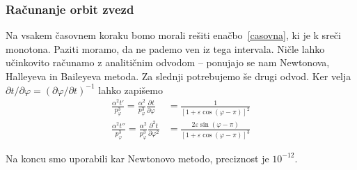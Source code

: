 \documentclass[12pt, a4paper]{article}
\newcommand{\der}[3][]{
    \ensuremath{ \frac{\partial^{#1} #2}{\partial #3^{#1}} }
}
\begin{document}
\subsubsection{Ra\v cunanje orbit zvezd}
Na vsakem \v casovnem koraku bomo morali re\v siti ena\v cbo~\eqref{casovna}, ki je k sre\v ci monotona. Paziti moramo,
da ne pademo ven iz tega intervala. Ni\v cle lahko u\v cinkovito ra\v cunamo z analiti\v cnim odvodom -- ponujajo se
nam Newtonova, Halleyeva in Baileyeva metoda. Za slednji potrebujemo \v se drugi odvod. Ker velja $\partial t/\partial
\varphi = (\partial \varphi/\partial t)^{-1}$ lahko zapi\v semo
\begin{align}
    \frac{\alpha^2 t'}{p_\varphi^3} = \frac{\alpha^2}{p_\varphi^3} \der{t}{\varphi} &= \frac{1}{[1 +
        \varepsilon\cos(\varphi - \pi)]^2}
	\label{odvodcasa} \\
    \frac{\alpha^2 t''}{p_\varphi^3} = \frac{\alpha^2}{p_\varphi^3} \der[2]{t}{\varphi} &=
        \frac{2\varepsilon\sin(\varphi - \pi)}{[1 + \varepsilon\cos(\varphi - \pi)]^3}
\end{align}

Na koncu smo uporabili kar Newtonovo metodo, preciznost je $10^{-12}$.
\end{document}
